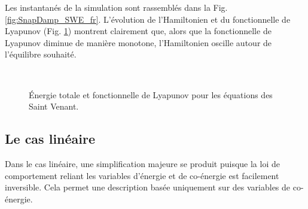 Les instantanés de la simulation sont rassemblés dans la Fig. \ref{fig:SnapDamp_SWE_fr}. L'évolution de l'Hamiltonien et du fonctionnelle de Lyapunov  (Fig. \ref{fig:HL_SWE_fr}) montrent clairement que, alors que la fonctionnelle de Lyapunov diminue de manière monotone, l'Hamiltonien oscille autour de l'équilibre souhaité.

\begin{figure}[htb]%
	\centering
	\hspace{8pt}%
	 \\
	\caption{Énergie totale et fonctionnelle de Lyapunov pour les équations des Saint Venant.}%
	\label{fig:HL_SWE_fr}%
\end{figure}


\begin{figure*}[p]
	\centering
	\hfil
	\hfil
	\hfil
	\hfil
	\caption{Instantanés à différents moments de la simulation pour les équations irrotationnelles de Saint Venant contrôlées à la frontière.}
	\label{fig:SnapDamp_SWE_fr}
	\hfil
\end{figure*}


\subsection*{Le cas linéaire}
Dans le cas linéaire, une simplification majeure se produit puisque la loi de comportement reliant les variables d'énergie et de co-énergie est facilement inversible. Cela permet une description basée uniquement sur des variables de co-énergie. \\

